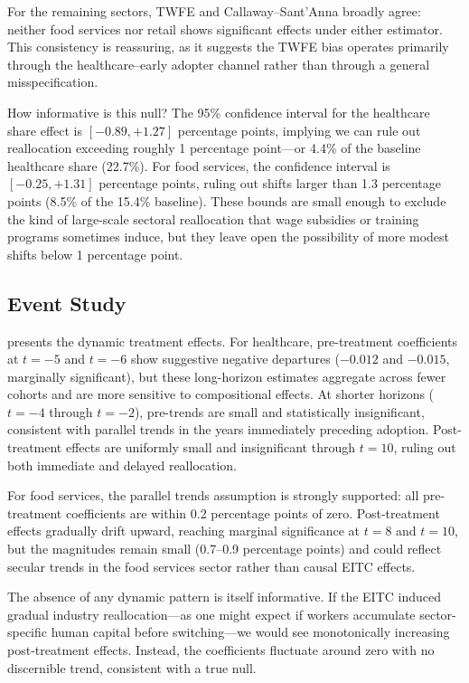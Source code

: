 \documentclass[12pt]{article}
\begin{document}
For the remaining sectors, TWFE and Callaway--Sant'Anna broadly agree: neither food services nor retail shows significant effects under either estimator. This consistency is reassuring, as it suggests the TWFE bias operates primarily through the healthcare--early adopter channel rather than through a general misspecification.

How informative is this null? The 95\% confidence interval for the healthcare share effect is $[-0.89, +1.27]$ percentage points, implying we can rule out reallocation exceeding roughly 1 percentage point---or 4.4\% of the baseline healthcare share (22.7\%). For food services, the confidence interval is $[-0.25, +1.31]$ percentage points, ruling out shifts larger than 1.3 percentage points (8.5\% of the 15.4\% baseline). These bounds are small enough to exclude the kind of large-scale sectoral reallocation that wage subsidies or training programs sometimes induce, but they leave open the possibility of more modest shifts below 1 percentage point.

\subsection{Event Study}



 presents the dynamic treatment effects. For healthcare, pre-treatment coefficients at $t = -5$ and $t = -6$ show suggestive negative departures ($-0.012$ and $-0.015$, marginally significant), but these long-horizon estimates aggregate across fewer cohorts and are more sensitive to compositional effects. At shorter horizons ($t = -4$ through $t = -2$), pre-trends are small and statistically insignificant, consistent with parallel trends in the years immediately preceding adoption. Post-treatment effects are uniformly small and insignificant through $t = 10$, ruling out both immediate and delayed reallocation.

For food services, the parallel trends assumption is strongly supported: all pre-treatment coefficients are within 0.2 percentage points of zero. Post-treatment effects gradually drift upward, reaching marginal significance at $t = 8$ and $t = 10$, but the magnitudes remain small (0.7--0.9 percentage points) and could reflect secular trends in the food services sector rather than causal EITC effects.

The absence of any dynamic pattern is itself informative. If the EITC induced gradual industry reallocation---as one might expect if workers accumulate sector-specific human capital before switching---we would see monotonically increasing post-treatment effects. Instead, the coefficients fluctuate around zero with no discernible trend, consistent with a true null.
\end{document}
